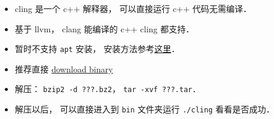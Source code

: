
\begin{issues}
\issueDraft
\end{issues}

\begin{itemize}
\item cling 是一个 c++ 解释器， 可以直接运行 c++ 代码无需编译．
\item 基于 llvm， clang 能编译的 c++ cling 都支持．
\item 暂时不支持 \verb|apt| 安装， 安装方法参考\href{https://kaustubh13.medium.com/how-to-install-cling-on-linux-or-wsl-8125798ed9b9}{这里}．
\item 推荐直接 \href{https://root.cern/download/cling/}{download binary}
\item 解压： \verb|bzip2 -d ???.bz2|， \verb|tar -xvf ???.tar|．
\item 解压以后， 可以直接进入到 \verb|bin| 文件夹运行 \verb|./cling| 看看是否成功．
\end{itemize}

